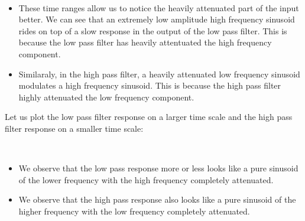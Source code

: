 \documentclass[11pt]{article}
\providecommand{\tightlist}{%
      \setlength{\itemsep}{0pt}\setlength{\parskip}{0pt}}
\begin{document}
	

	

    \begin{center}
    \end{center}
    { \hspace*{\fill} \\}
    
	
		
    \begin{itemize}
\tightlist
\item
  These time ranges allow us to notice the heavily attenuated part of
  the input better. We can see that an extremely low amplitude high
  frequency sinusoid rides on top of a slow response in the output of
  the low pass filter. This is because the low pass filter has heavily
  attentuated the high frequency component.
\item
  Similaraly, in the high pass filter, a heavily attenuated low
  frequency sinusoid modulates a high frequency sinusoid. This is
  because the high pass filter highly attenuated the low frequency
  component.
\end{itemize}

	

	
		
    Let us plot the low pass filter response on a larger time scale and the
high pass filter response on a smaller time scale:

	

	

    \begin{center}
    \end{center}
    { \hspace*{\fill} \\}
    
	
		
    \begin{itemize}
\tightlist
\item
  We observe that the low pass response more or less looks like a pure
  sinusoid of the lower frequency with the high frequency completely
  attenuated.
\item
  We observe that the high pass response also looks like a pure sinusoid
  of the higher frequency with the low frequency completely attenuated.
\end{itemize}
\end{document}
